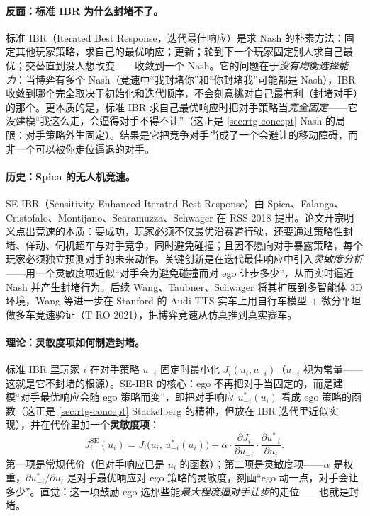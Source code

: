 \paragraph{反面：标准 IBR 为什么封堵不了。}
标准 IBR（Iterated Best Response，迭代最佳响应）是求 Nash 的朴素方法：固定其他玩家策略，求自己的最优响应；更新；轮到下一个玩家固定别人求自己最优；交替直到没人想改变——收敛到一个 Nash。它的问题在于\emph{没有均衡选择能力}：当博弈有多个 Nash（竞速中“我封堵你”和“你封堵我”可能都是 Nash），IBR 收敛到哪个完全取决于初始化和迭代顺序，不会刻意挑对自己最有利（封堵对手）的那个。更本质的是，标准 IBR 求自己最优响应时把对手策略当\emph{完全固定}——它没建模“我这么走，会逼得对手不得不让”（这正是 \cref{sec:rtg-concept} Nash 的局限：对手策略外生固定）。结果是它把竞争对手当成了一个会避让的移动障碍，而非一个可以被你走位逼退的对手。

\paragraph{历史：Spica 的无人机竞速。}
SE-IBR（Sensitivity-Enhanced Iterated Best Response）由 Spica、Falanga、Cristofalo、Montijano、Scaramuzza、Schwager 在 RSS 2018 提出\cite{spica2020realtime}。论文开宗明义点出竞速的本质：要成功，玩家必须不仅最优沿赛道行驶，还要通过策略性封堵、佯动、伺机超车与对手竞争，同时避免碰撞；且因不愿向对手暴露策略，每个玩家必须独立预测对手的未来动作。关键创新是在迭代最佳响应中引入\emph{灵敏度分析}——用一个灵敏度项近似“对手会为避免碰撞而对 ego 让步多少”，从而实时逼近 Nash 并产生封堵行为。后续 Wang、Taubner、Schwager 将其扩展到多智能体 3D 环境，Wang 等进一步在 Stanford 的 Audi TTS 实车上用自行车模型 + 微分平坦做多车竞速验证（T-RO 2021）\cite{wang2021gametheoretic}，把博弈竞速从仿真推到真实赛车。

\paragraph{理论：灵敏度项如何制造封堵。}
标准 IBR 里玩家 $i$ 在对手策略 $u_{-i}$ 固定时最小化 $J_i(u_i,u_{-i})$（$u_{-i}$ 视为常量——这就是它不封堵的根源）。SE-IBR 的核心：ego 不再把对手当固定的，而是建模“对手最优响应会随 ego 策略而变”，即把对手响应 $u_{-i}^*(u_i)$ 看成 ego 策略的函数（这正是 \cref{sec:rtg-concept} Stackelberg 的精神，但放在 IBR 迭代里近似实现），并在代价里加一个\textbf{灵敏度项}：
\begin{equation}
  J_i^{\mathrm{SE}}(u_i)=J_i\big(u_i,\,u_{-i}^*(u_i)\big)+\alpha\cdot\frac{\partial J_i}{\partial u_{-i}}\cdot\frac{\partial u_{-i}^*}{\partial u_i}.
  \label{eq:rtg-seibr-cost}
\end{equation}
第一项是常规代价（但对手响应已是 $u_i$ 的函数）；第二项是灵敏度项——$\alpha$ 是权重，$\partial u_{-i}^*/\partial u_i$ 是对手最优响应对 ego 策略的灵敏度，刻画“ego 动一点，对手会让多少”。直觉：这一项鼓励 ego 选那些能\emph{最大程度逼对手让步}的走位——也就是封堵。

